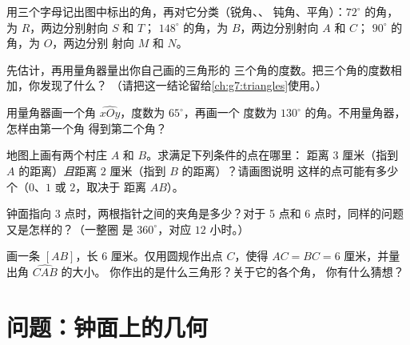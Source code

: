\begin{exercise}[$\star$]\label{exo:g6:lines:7}
用三个字母记出图中标出的角，再对它分类（锐角、、
钝角、平角）：$72^\circ$ 的角，为 $R$，两边分别射向 $S$ 和 $T$；
$148^\circ$ 的角，为 $B$，两边分别射向 $A$ 和 $C$；
$90^\circ$ 的角，为 $O$，两边分别
射向 $M$ 和 $N$。
\end{exercise}

\begin{exercise}[$\star$]\label{exo:g6:lines:8}
先估计，再用量角器量出你自己画的三角形的
三个角的度数。把三个角的度数相加，你发现了什么？
（请把这一结论留给\cref{ch:g7:triangles}使用。）
\end{exercise}

\begin{exercise}[$\star$]\label{exo:g6:lines:9}
用量角器画一个角 $\widehat{xOy}$，度数为 $65^\circ$，再画一个
度数为 $130^\circ$ 的角。不用量角器，怎样由第一个角
得到第二个角？
\end{exercise}

\begin{exercise}[$\star\star$]\label{exo:g6:lines:10}
地图上画有两个村庄 $A$ 和 $B$。求满足下列条件的点在哪里：
距离 $3$ 厘米（指到 $A$ 的距离）\emph{且}距离 $2$ 厘米（指到 $B$ 的距离）？请画图说明
这样的点可能有多少个（$0$、$1$ 或 $2$，取决于
距离 $AB$）。
\end{exercise}

\begin{exercise}[$\star\star$]\label{exo:g6:lines:11}
钟面指向 3 点时，两根指针之间的夹角是多少？对于 5 点和
6 点时，同样的问题又是怎样的？（一整圈
是 $360^\circ$，对应 $12$ 小时。）
\end{exercise}

\begin{exercise}[$\star\star\star$]\label{exo:g6:lines:12}
画一条 $[AB]$，长 $6$ 厘米。仅用圆规作出点 $C$，使得
$AC = BC = 6$ 厘米，并量出角 $\widehat{CAB}$ 的大小。
你作出的是什么三角形？关于它的各个角，
你有什么猜想？
\end{exercise}

\section{问题：钟面上的几何}

